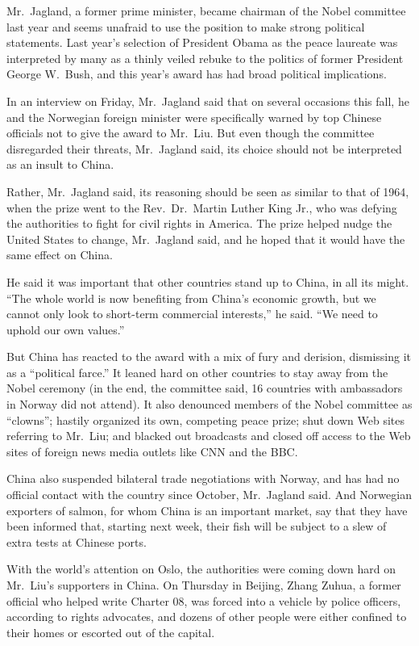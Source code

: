 ﻿\documentclass[12pt]{article}
\begin{document}
Mr.~Jagland, a former prime minister, became chairman of the Nobel committee last year and seems
unafraid to use the position to make strong political statements. Last year's selection of President
Obama as the peace laureate was interpreted by many as a thinly veiled rebuke to the politics of
former President George W.~Bush, and this year's award has had broad political implications.

In an interview on Friday, Mr.~Jagland said that on several occasions this fall, he and the
Norwegian foreign minister were specifically warned by top Chinese officials not to give the award
to Mr.~Liu. But even though the committee disregarded their threats, Mr.~Jagland said, its choice
should not be interpreted as an insult to China.

Rather, Mr.~Jagland said, its reasoning should be seen as similar to that of 1964, when the prize
went to the Rev.~Dr.~Martin Luther King Jr., who was defying the authorities to fight for civil
rights in America. The prize helped nudge the United States to change, Mr.~Jagland said, and he
hoped that it would have the same effect on China.

He said it was important that other countries stand up to China, in all its might. ``The whole world
is now benefiting from China's economic growth, but we cannot only look to short-term commercial
interests,'' he said. ``We need to uphold our own values.''

But China has reacted to the award with a mix of fury and derision, dismissing it as a ``political
farce.'' It leaned hard on other countries to stay away from the Nobel ceremony (in the end, the
committee said, 16 countries with ambassadors in Norway did not attend). It also denounced members
of the Nobel committee as ``clowns''; hastily organized its own, competing peace prize; shut down
Web sites referring to Mr.~Liu; and blacked out broadcasts and closed off access to the Web sites of
foreign news media outlets like CNN and the BBC.

China also suspended bilateral trade negotiations with Norway, and has had no official contact with
the country since October, Mr.~Jagland said. And Norwegian exporters of salmon, for whom China is an
important market, say that they have been informed that, starting next week, their fish will be
subject to a slew of extra tests at Chinese ports.

With the world's attention on Oslo, the authorities were coming down hard on Mr.~Liu's supporters in
China. On Thursday in Beijing, Zhang Zuhua, a former official who helped write Charter 08, was
forced into a vehicle by police officers, according to rights advocates, and dozens of other people
were either confined to their homes or escorted out of the capital.
\end{document}
